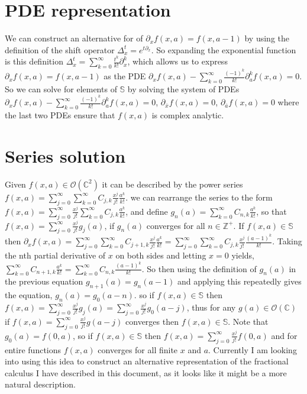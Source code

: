 \documentclass[%
 onecolumn,
 amsmath, amssymb, aps, pra, 10pt
]{revtex4-2}
\begin{document}
\section*{PDE representation}
We can construct an alternative for of $\partial_x f(x, a) = f(x, a - 1)$ by using the definition of the shift operator $\Delta_{x}^{t} = e^{t \partial_x}$. So expanding the exponential function is this definition $\Delta_{x}^t = \sum_{k=0}^{\infty} \frac{t^k}{k!} \partial_{x}^{k}$, which allows us to express $\partial_x f(x, a) = f(x, a - 1)$ as the PDE $\partial_x f(x, a) - \sum_{k=0}^{\infty} \frac{(-1)^k}{k!}\partial_{a}^{k} f(x, a) = 0$. So we can solve for elements of $\mathbb{S}$ by solving the system of PDEs $\partial_x f(x, a) - \sum_{k=0}^{\infty} \frac{(-1)^k}{k!} \partial_{a}^{k} f(x, a) = 0$, $\partial_{\bar{x}} f(x, a) = 0$, $\partial_{\bar{a}} f(x, a) = 0$ where the last two PDEs ensure that $f(x, a)$ is complex analytic.

\section*{Series solution}
Given $f(x, a) \in \mathcal{O}(\mathbb{C}^2)$ it can be described by the power series $f(x, a) = \sum_{j=0}^{\infty} \sum_{k=0}^{\infty} C_{j, k} \frac{x^j}{j!} \frac{a^k}{k!}$. we can rearrange the series to  the form $f(x, a) = \sum_{j=0}^{\infty} \frac{x^j}{j!} \sum_{k=0}^{\infty} C_{j, k} \frac{a^k}{k!}$, and define $g_n(a) = \sum_{k=0}^{\infty} C_{n, k} \frac{a^k}{k!}$, so that $f(x, a) = \sum_{j=0}^{\infty} \frac{x^j}{j!} g_j(a)$, if $g_n(a)$ converges for all $n \in \mathbb{Z}^+$. If $f(x, a) \in \mathbb{S}$ then $\partial_x f(x, a) = \sum_{j=0}^{\infty} \sum_{k=0}^{\infty} C_{j + 1, k} \frac{x^j}{j!} \frac{a^k}{k!} = \sum_{j=0}^{\infty} \sum_{k=0}^{\infty} C_{j, k} \frac{x^j}{j!} \frac{(a - 1)^k}{k!}$. Taking the nth partial derivative of $x$ on both sides and letting $x=0$ yields, $\sum_{k=0}^{\infty} C_{n + 1, k} \frac{a^k}{k!} = \sum_{k=0}^{\infty} C_{n, k} \frac{(a -1)^k}{k!}$. So then using the definition of $g_n(a)$ in the previous equation $g_{n+1}(a) = g_{n}(a - 1)$ and applying this repeatedly gives the equation, $g_{n}(a) = g_{0}(a - n)$. so if $f(x, a) \in \mathbb{S}$ then $f(x, a) = \sum_{j=0}^{\infty} \frac{x^j}{j!} g_{j}(a) = \sum_{j=0}^{\infty} \frac{x^j}{j!} g_{0}(a - j)$, thus for any $g(a) \in \mathcal{O}(\mathbb{C})$ if $f(x, a) = \sum_{j=0}^{\infty} \frac{x^j}{j!} g(a - j)$ converges then $f(x, a) \in \mathbb{S}$. Note that $g_{0}(a) = f(0, a)$, so if $f(x, a) \in \mathbb{S}$ then $f(x, a) = \sum_{j=0}^{\infty} \frac{x^j}{j!} f(0, a)$ and for entire functions $f(x, a)$ converges for all finite $x$ and $a$. Currently I am looking into using this idea to construct an alternative representation of the fractional calculus I have described in this document, as it looks like it might be a more natural description.



\end{document}
